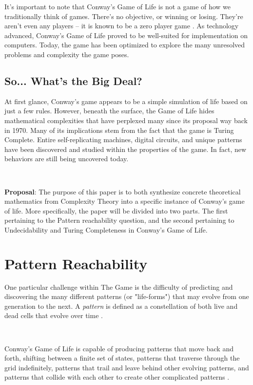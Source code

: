 \documentclass{article}
\theoremstyle{definition}
\theoremstyle{plain}
\theoremstyle{plain}
\begin{document}
It’s important to note that Conway’s Game of Life is not a game of how we traditionally think of games. There’s no objective, or winning or losing. They’re aren’t even any players – it is known to be a zero player game \cite{Beginning_Life_2006}. As technology advanced, Conway’s Game of Life proved to be well-suited for implementation on computers. Today, the game has been optimized to explore the many unresolved problems and complexity the game poses. 

\subsection{So... What's the Big Deal?}

At first glance, Conway’s game appears to be a simple simulation of life based on just a few rules. However, beneath the surface, the Game of Life hides mathematical complexities that have perplexed many since its proposal way back in 1970. Many of its implications stem from the fact that the game is Turing Complete. Entire self-replicating machines, digital circuits, and unique patterns have been discovered and studied within the properties of the game. In fact, new behaviors are still being uncovered today. 

\ 

\textbf{Proposal}: The purpose of this paper is to both synthesize concrete theoretical mathematics from Complexity Theory into a specific instance of Conway's game of life. More specifically, the paper will be divided into two parts. The first pertaining to the Pattern reachability question, and the second pertaining to Undecidability and Turing Completeness in Conway’s Game of Life. 

\section {Pattern Reachability}

One particular challenge within The Game is the difficulty of predicting and discovering the many different patterns (or "life-forms") that may evolve from one generation to the next. A\textit{ pattern} is defined as a constellation of both live and dead cells that evolve over time \cite{Bontes2019}.

\

Conway's Game of Life is capable of producing patterns that move back and forth, shifting between a finite set of states, patterns that traverse through the grid indefinitely, patterns that trail and leave behind other evolving patterns, and patterns that collide with each other to create other complicated patterns \cite{JG2022conway}.
\end{document}
